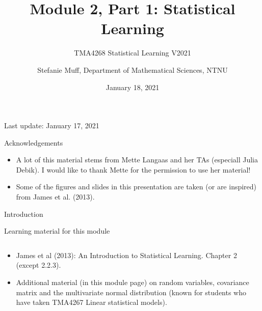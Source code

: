 \documentclass[ignorenonframetext,]{beamer}
\title{Module 2, Part 1: Statistical Learning}
\subtitle{TMA4268 Statistical Learning V2021}
\author{Stefanie Muff, Department of Mathematical Sciences, NTNU}
\date{January 18, 2021}
\begin{document}
\frame{\titlepage}

\begin{frame}

Last update: January 17, 2021

\end{frame}

\begin{frame}{Acknowledgements}
\protect\hypertarget{acknowledgements}{}

\begin{itemize}
\item
  A lot of this material stems from Mette Langaas and her TAs (especiall
  Julia Debik). I would like to thank Mette for the permission to use
  her material!
\item
  Some of the figures and slides in this presentation are taken (or are
  inspired) from James et al. (2013).
\end{itemize}

\end{frame}

\begin{frame}{Introduction}
\protect\hypertarget{introduction}{}

\begin{block}{Learning material for this module}

\(~\)

\begin{itemize}
\item
  James et al (2013): An Introduction to Statistical Learning. Chapter 2
  (except 2.2.3).
\item
  Additional material (in this module page) on random variables,
  covariance matrix and the multivariate normal distribution (known for
  students who have taken TMA4267 Linear statistical models).
\end{itemize}

\end{block}

\end{frame}
\end{document}
